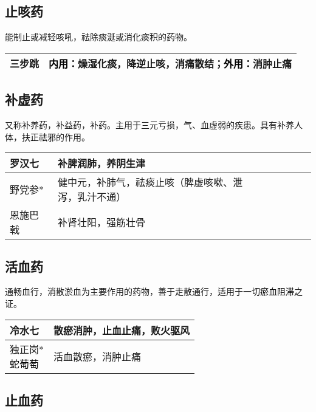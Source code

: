 \documentclass[cn,black,12pt,normal,founder]{elegantnote}
\newcommand{\redt}[1]{\textcolor{black}{{}#1}}      %
\begin{document}
\subsection{止咳药}

能制止或减轻咳吼，祛除痰涎或消化痰积的药物。

\begin{table}[H]
  \begin{tabular}{|l|l|}
  \hline
  三步跳 & \redt{内用：}燥湿化痰，降逆止咳，消痛散结；\redt{外用：}消肿止痛     \\ \hline
  \end{tabular}
\end{table}

\subsection{补虚药}

又称补养药，补益药，补药。主用于三元亏损，气、血虚弱的疾患。具有补养人体，\redt{扶正祛邪}的作用。

\begin{table}[H]
  \begin{tabular}{|l|l|}
  \hline
  罗汉七 & 补脾润肺，养阴生津 \\ \hline
  野党参* & 健中元，补肺气，祛痰止咳（脾虚咳嗽、\redt{泄泻}，乳汁不通）  \\  \hline
  恩施巴戟 & 补肾壮阳，强筋壮骨 \\ \hline
  \end{tabular}
\end{table}

\subsection{活血药}

通畅血行，消散淤血为主要作用的药物，善于走散通行，适用于一切\redt{瘀血阻滞}之证。

\begin{table}[H]
  \begin{tabular}{|l|l|}
  \hline
  冷水七 & 散瘀消肿，止血止痛，败火驱风 \\ \hline
  \makecell[l]{独正岗* \\ \redt{蛇葡萄}} & 活血散瘀，消肿止痛  \\  \hline
  \end{tabular}
\end{table}

\subsection{止血药}
\end{document}
